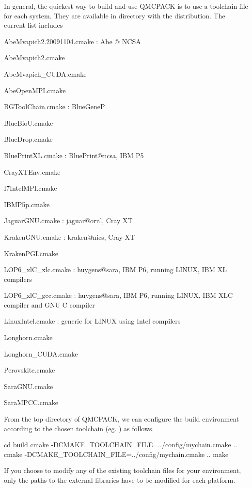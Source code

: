 In general, the quickest way to build and use QMCPACK is to use a toolchain file for each system. They are available in  directory with the distribution. The current list includes
\begin{itemize*}
\item{} AbeMvapich2.20091104.cmake : Abe @ NCSA
\item{} AbeMvapich2.cmake
\item{} AbeMvapich\_CUDA.cmake
\item{} AbeOpenMPI.cmake
\item{} BGToolChain.cmake : BlueGeneP
\item{} BlueBioU.cmake
\item{} BlueDrop.cmake
\item{} BluePrintXL.cmake : BluePrint@ncsa, IBM P5
\item{} CrayXTEnv.cmake
\item{} I7IntelMPI.cmake
\item{} IBMP5p.cmake
\item{} JaguarGNU.cmake : jaguar@ornl, Cray XT
\item{} KrakenGNU.cmake : kraken@nics, Cray XT
\item{} KrakenPGI.cmake
\item{} LOP6\_xlC\_xlc.cmake : huygens@sara, IBM P6, running LINUX, IBM XL compilers
\item{} LOP6\_xlC\_gcc.cmake : huygens@sara, IBM P6, running LINUX, IBM XLC compiler and GNU C compiler
\item{} LinuxIntel.cmake : generic for LINUX using Intel compilers
\item{} Longhorn.cmake
\item{} Longhorn\_CUDA.cmake
\item{} Perovskite.cmake
\item{} SaraGNU.cmake
\item{} SaraMPCC.cmake
\end{itemize*}
From the top directory of QMCPACK, we can configure the build environment according to the chosen toolchain (eg. ) as follows.
\begin{term}
cd build
cmake -DCMAKE_TOOLCHAIN_FILE=../config/mychain.cmake ..
cmake -DCMAKE_TOOLCHAIN_FILE=../config/mychain.cmake ..
make
\end{term}
If you choose to modify any of the existing toolchain files for your environment, only the paths to the external libraries have to be modified for each platform.

